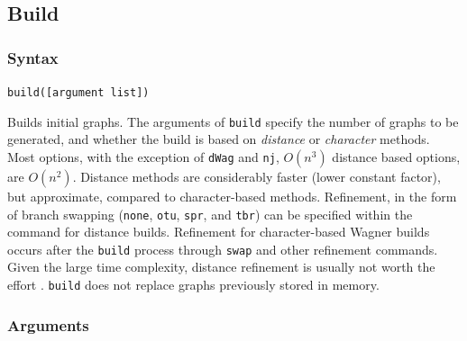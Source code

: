 \subsection{Build}
	\subsubsection{Syntax}
		\texttt{build([argument list])}
	
	\begin{phygdescription}
		{Builds initial graphs. The arguments of \texttt{build} specify the number of graphs 
		to be generated, and whether the build is based on \textit{distance} or \textit{character} 
		methods. Most options, with the exception of \texttt{dWag} and \texttt{nj}, $O(n^3)$ distance based 
		options, are $O(n^2)$. Distance methods are considerably faster (lower constant 
		factor), but approximate, compared to character-based methods. Refinement, in the form 
		of branch swapping (\texttt{none}, \texttt{otu}, \texttt{spr}, and \texttt{tbr}) can be 
		specified within the command for distance builds. Refinement for character-based 
		Wagner builds occurs after the \texttt{build} process through \texttt{swap} and other
		refinement commands. Given the large time complexity, distance refinement is usually 
		not worth the effort \citep{Wheeler2021}. \texttt{build} does not replace graphs previously 
		stored in memory.}
	\end{phygdescription}
		
	\subsubsection{Arguments}

